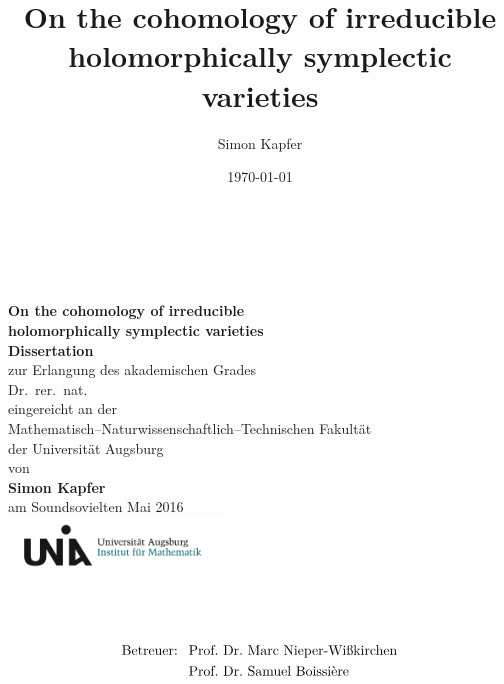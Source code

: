 \documentclass[11pt,twoside]{article}
\begin{document}
\title{
\bf On the cohomology of irreducible holomorphically symplectic varieties
}


\author{Simon Kapfer}


\date{\today}
\thispagestyle{empty}
\begin{center}
\ \\
\ \\
\ \\
\textbf{ \LARGE On the cohomology of irreducible\\holomorphically symplectic varieties}
\\
\vspace{1cm}
\Large \textbf{Dissertation} \\
\textnormal\large zur Erlangung des akademischen Grades \\
\vspace{1mm}
Dr.~rer.~nat. \\
\vspace{8mm}
eingereicht an der \\
Mathematisch--Naturwissenschaftlich--Technischen Fakult\"at\\
der Universit\"at Augsburg
\\ \vspace{6mm}
von \\
\textbf{Simon Kapfer}\\
\vspace{5mm}
am Soundsovielten Mai 2016 \\
\vspace{8mm}
\includegraphics[height=30mm]{LogoInstitut.png}
\vspace{-13mm}
\begin{align*}
\text{Betreuer: }\ 
& \text{Prof.~Dr.~Marc Nieper-Wi\ss kirchen}\\\vspace{-1cm}
& \text{Prof.~Dr.~Samuel Boissi\`ere}
\end{align*}
\end{center}
\cleardoublepage
\end{document}
